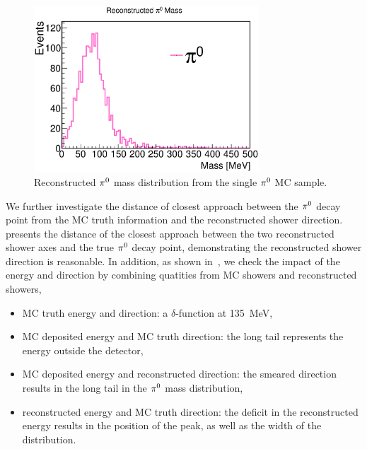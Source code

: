 \begin{figure}[htbp]
\begin{center}
\includegraphics[width=0.75\textwidth]{figs/mc/single_pi0/RecoPi0Mass.eps}
\caption{Reconstructed ${\pi}^0$ mass distribution from the single ${\pi}^0$
MC sample.}
\label{fig:mpi0_single_pi0}
\end{center}
\end{figure}
We further investigate the distance of closest approach between
the ${\pi}^0$ decay point from the MC truth information and
the reconstructed shower direction.
 presents the distance of the closest
approach between the two reconstructed shower axes and the
true ${\pi}^0$ decay point,
demonstrating the reconstructed shower direction is reasonable.
In addition, as shown in~,
we check the impact of the energy and direction by
combining quatities from MC showers
and reconstructed showers,
\begin{itemize}
\item MC truth energy and direction: a $\delta$-function at 135~MeV,
\item MC deposited energy and MC truth direction: the long tail
      represents the energy outside the detector,
\item MC deposited energy and reconstructed direction: the smeared
      direction results in the long tail in the ${\pi}^0$ mass distribution,
\item reconstructed energy and MC truth direction: the deficit in
      the reconstructed energy results in the position of the peak,
      as well as the width of the distribution.
\end{itemize}

